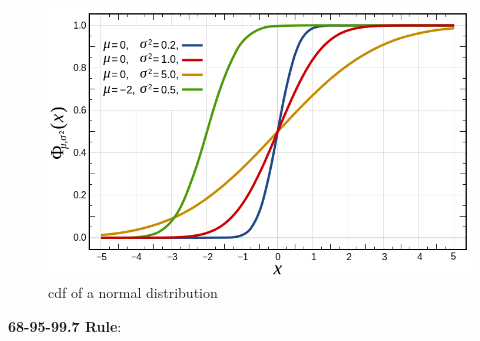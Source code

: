 \documentclass[	DIV=calc,%
paper=a4,%
fontsize=11pt,%
twocolumn]{scrartcl} %
\newcommand{\formdesc}[1]{\noindent\textbf{#1}}
\begin{document}
\begin{figure}[ht!]
	\centering
	\caption{cdf of a normal distribution}
	\label{fig:cdf-normal}
	\graphicspath{ {images/math/} }
	\includegraphics[width=\linewidth]{normal_distribution_cdf}
\end{figure}

\newpage
\formdesc{68-95-99.7 Rule}:
\end{document}
